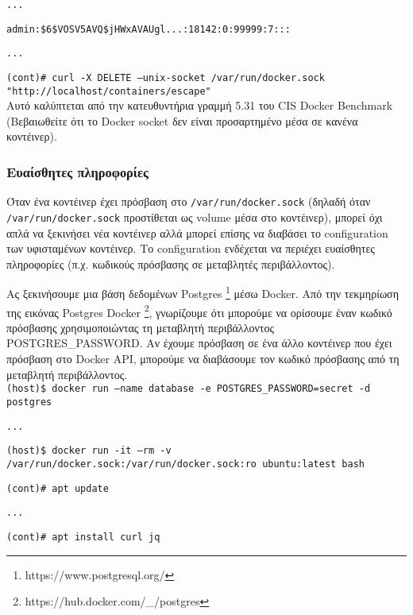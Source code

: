 \texttt{\textlatin{...}}

\texttt{\textlatin{admin:\$6\$VOSV5AVQ\$jHWxAVAUgl...:18142:0:99999:7:::}}

\texttt{\textlatin{...}}

\texttt{\textlatin{(cont)\# curl -X DELETE --unix-socket /var/run/docker.sock "http://localhost/containers/escape"}} \\

Αυτό καλύπτεται από την κατευθυντήρια γραμμή 5.31 του
\textlatin{CIS Docker Benchmark} (Βεβαιωθείτε ότι το \textlatin{Docker socket}
δεν είναι προσαρτημένο μέσα σε κανένα κοντέινερ).

\subsubsection{Ευαίσθητες πληροφορίες}

Όταν ένα κοντέινερ έχει πρόσβαση στο \texttt{\textlatin{/var/run/docker.sock}}
(δηλαδή όταν \texttt{\textlatin{/var/run/docker.sock}} προστίθεται ως
\textlatin{volume} μέσα στο κοντέινερ), μπορεί όχι απλά να ξεκινήσει
νέα κοντέινερ αλλά μπορεί επίσης να διαβάσει το \textlatin{configuration} των
υφισταμένων κοντέινερ. Το \textlatin{configuration} ενδέχεται να περιέχει
ευαίσθητες πληροφορίες (π.χ. κωδικούς πρόσβασης σε μεταβλητές περιβάλλοντος).

Ας ξεκινήσουμε μια βάση δεδομένων \textlatin{Postgres}
\footnote{\textlatin{https://www.postgresql.org/}} μέσω \textlatin{Docker}.
Από την τεκμηρίωση της εικόνας \textlatin{Postgres Docker}
\footnote{\textlatin{https://hub.docker.com/\_/postgres}}, γνωρίζουμε ότι
μπορούμε να ορίσουμε έναν κωδικό πρόσβασης χρησιμοποιώντας τη μεταβλητή
περιβάλλοντος \textlatin{POSTGRES\_PASSWORD}. Αν έχουμε πρόσβαση σε
ένα άλλο κοντέινερ που έχει πρόσβαση στο \textlatin{Docker API}, μπορούμε να
διαβάσουμε τον κωδικό πρόσβασης από τη μεταβλητή περιβάλλοντος. \\

\texttt{\textlatin{(host)\$ docker run --name database -e POSTGRES\_PASSWORD=secret -d postgres}}

\texttt{\textlatin{...}}

\texttt{\textlatin{(host)\$ docker run -it --rm -v /var/run/docker.sock:/var/run/docker.sock:ro ubuntu:latest bash}}

\texttt{\textlatin{(cont)\# apt update}}

\texttt{\textlatin{...}}

\texttt{\textlatin{(cont)\# apt install curl jq}}

